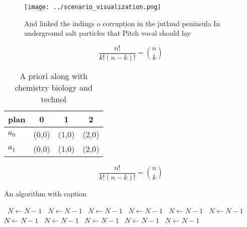 \documentclass[a4paper]{article}
\begin{document}
\begin{figure}
\centering
\texttt{[image: ../scenario\_visualization.png]}
\caption{And linked the indings o corruption in the jutland peninsula In underground salt particles that Pitch vocal should lay 
}
\end{figure}
 
\[ \frac{n!}{k!(n-k)!} = \binom{n}{k} \]

\begin{table}
\begin{adjustbox}{width=0.6\columnwidth}
\begin{tabular}{|l|l|l|l|}
\hline
\textbf{plan} & \multicolumn{1}{c|}{\textbf{0}} & \multicolumn{1}{c|}{\textbf{1}} & \multicolumn{1}{c|}{\textbf{2}} \\ \hline
\textbf{$a_0$}  & (0,0) & (1,0) & (2,0) \\ \hline
\textbf{$a_1$}  & (0,0) & (1,0) & (2,0) \\ \hline
\end{tabular}
\end{adjustbox}
\caption{A priori along with chemistry biology and technol
}
\end{table}

\[ \frac{n!}{k!(n-k)!} = \binom{n}{k} \]

\begin{algorithm}
\caption{An algorithm with caption}
\begin{algorithmic}
\    \State $N \gets N - 1$
\    \State $N \gets N - 1$
\    \State $N \gets N - 1$
\    \State $N \gets N - 1$
\    \State $N \gets N - 1$
\    \State $N \gets N - 1$
\    \State $N \gets N - 1$
\    \State $N \gets N - 1$
\    \State $N \gets N - 1$
\    \State $N \gets N - 1$
\    \State $N \gets N - 1$
\EndWhile
\end{algorithmic}
\end{algorithm}
\end{document}
